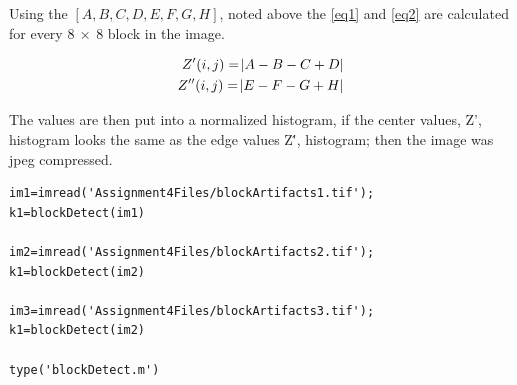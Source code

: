 \documentclass{article}
\begin{document}
Using the $[A, B, C, D, E, F, G, H]$, noted above the \eqref{eq1} and
\eqref{eq2} are calculated
for every $8 \ \times \ 8$ block in the image. 

\begin{align}
	Z'(i,j)=\abs{A-B-C+D}\label{eq1}\\
	Z''(i,j)=\abs{E-F-G+H}\label{eq2}
\end{align}

The values are then put into a normalized histogram, if the center values,
Z', histogram looks the same as the edge values Z\'', histogram; then
the image was jpeg compressed. 

\begin{verbatim}
im1=imread('Assignment4Files/blockArtifacts1.tif');
k1=blockDetect(im1)

im2=imread('Assignment4Files/blockArtifacts2.tif');
k1=blockDetect(im2)

im3=imread('Assignment4Files/blockArtifacts3.tif');
k1=blockDetect(im2)

type('blockDetect.m')
\end{verbatim}
\end{document}
